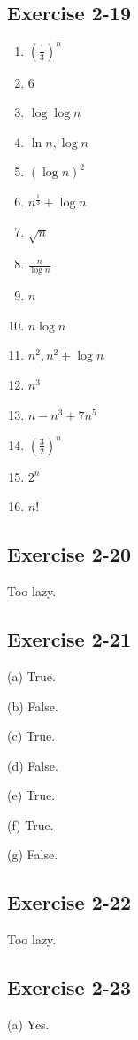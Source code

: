 \documentclass{book}
\begin{document}
\subsection*{Exercise 2-19}
\begin{enumerate}
    \item $\left(\frac{1}{3}\right)^n$
    \item $6$
    \item $\log \log n$
    \item $\ln n, \log n$
    \item $(\log n)^2$
    \item $n^{\frac{1}{3}} + \log n$
    \item $\sqrt{n}$
    \item $\frac{n}{\log n}$
    \item $n$
    \item $n \log n$
    \item $n^2, n^2 + \log n$
    \item $n^3$
    \item $n - n^3 + 7n^5$
    \item $\left(\frac{3}{2}\right)^n$
    \item $2^n$
    \item $n!$
\end{enumerate}

\subsection*{Exercise 2-20}
Too lazy.

\subsection*{Exercise 2-21}
(a) True.

\noindent
(b) False.

\noindent
(c) True.

\noindent
(d) False.

\noindent
(e) True.

\noindent
(f) True.

\noindent
(g) False.

\subsection*{Exercise 2-22}
Too lazy.

\subsection*{Exercise 2-23}
(a) Yes.
\end{document}
